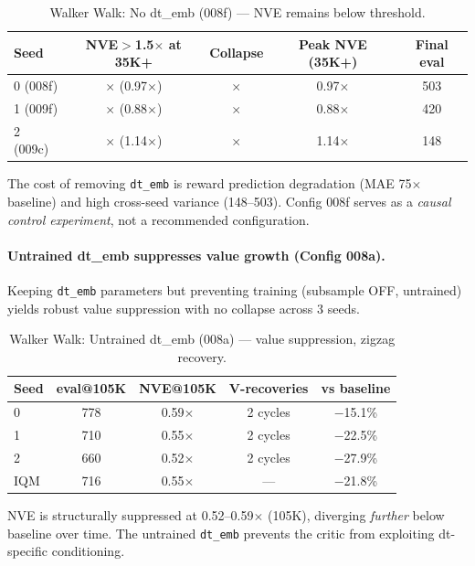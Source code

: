 \documentclass[letterpaper]{article}
\begin{document}
\begin{table}[h]
\centering
\caption{Walker Walk: No dt\_emb (008f) --- NVE remains below threshold.}
\label{tab:walker_no_dtemb}
\begin{tabular}{lcccc}
\toprule
Seed & NVE$>$1.5$\times$ at 35K+ & Collapse & Peak NVE (35K+) & Final eval \\
\midrule
0 (008f) & $\times$ (0.97$\times$) & $\times$ & 0.97$\times$ & 503 \\
1 (009f) & $\times$ (0.88$\times$) & $\times$ & 0.88$\times$ & 420 \\
2 (009c) & $\times$ (1.14$\times$) & $\times$ & 1.14$\times$ & 148 \\
\bottomrule
\end{tabular}
\end{table}

The cost of removing \texttt{dt\_emb} is reward prediction degradation (MAE 75$\times$ baseline) and high cross-seed variance (148--503).
Config 008f serves as a \emph{causal control experiment}, not a recommended configuration.

\paragraph{Untrained dt\_emb suppresses value growth (Config 008a).}
Keeping \texttt{dt\_emb} parameters but preventing training (subsample OFF, untrained) yields robust value suppression with no collapse across 3 seeds.

\begin{table}[h]
\centering
\caption{Walker Walk: Untrained dt\_emb (008a) --- value suppression, zigzag recovery.}
\label{tab:walker_untrained}
\begin{tabular}{lcccc}
\toprule
Seed & eval@105K & NVE@105K & V-recoveries & vs baseline \\
\midrule
0 & 778 & 0.59$\times$ & 2 cycles & $-$15.1\% \\
1 & 710 & 0.55$\times$ & 2 cycles & $-$22.5\% \\
2 & 660 & 0.52$\times$ & 2 cycles & $-$27.9\% \\
\midrule
IQM & 716 & 0.55$\times$ & --- & $-$21.8\% \\
\bottomrule
\end{tabular}
\end{table}

NVE is structurally suppressed at 0.52--0.59$\times$ (105K), diverging \emph{further} below baseline over time.
The untrained \texttt{dt\_emb} prevents the critic from exploiting dt-specific conditioning.
\end{document}
